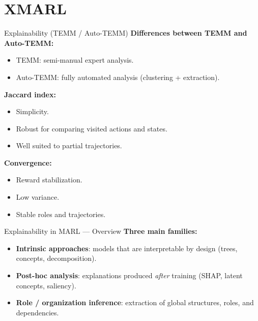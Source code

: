 
\section{XMARL}

\begin{frame}{Explainability (TEMM / Auto-TEMM)}
    \textbf{Differences between TEMM and Auto-TEMM:}
    \begin{itemize}
        \item TEMM: semi-manual expert analysis.
        \item Auto-TEMM: fully automated analysis (clustering + extraction).
    \end{itemize}

    \textbf{Jaccard index:}
    \begin{itemize}
        \item Simplicity.
        \item Robust for comparing visited actions and states.
        \item Well suited to partial trajectories.
    \end{itemize}

    \textbf{Convergence:}
    \begin{itemize}
        \item Reward stabilization.
        \item Low variance.
        \item Stable roles and trajectories.
    \end{itemize}
\end{frame}

\begin{frame}{Explainability in MARL --- Overview}
    \small
    \textbf{Three main families:}
    \begin{itemize}
        \item \textbf{Intrinsic approaches}: models that are interpretable by design (trees, concepts, decomposition).
        \item \textbf{Post-hoc analysis}: explanations produced \emph{after} training (SHAP, latent concepts, saliency).
        \item \textbf{Role / organization inference}: extraction of global structures, roles, and dependencies.
    \end{itemize}
\end{frame}


